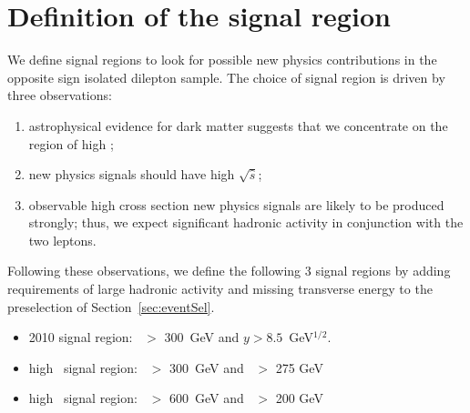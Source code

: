 \section{Definition of the signal region}
\label{sec:sigregion}

We define signal regions to look for possible
new physics contributions in the opposite sign isolated 
dilepton sample. The choice of signal region is driven by 
three observations:
\begin{enumerate}
\item astrophysical evidence for dark matter suggests that
we concentrate on the region of high \met;
\item new physics signals should have high $\sqrt{\hat{s}}$;
\item observable high cross section new physics signals 
are likely to be produced strongly;  thus, we expect significant
hadronic activity in conjunction with the two leptons.
\end{enumerate}

Following these observations, we define the following 3 signal regions by 
adding requirements of large hadronic activity and missing transverse energy 
to the preselection of Section~\ref{sec:eventSel}. 
\begin{itemize}
\item 2010 signal region:       \Ht\ $>$ 300~GeV and $y > 8.5$~GeV$^{1/2}$.
\item high \met\ signal region: \Ht\ $>$ 300~GeV and \met\ $>$ 275 GeV
\item high \Ht\  signal region: \Ht\ $>$ 600~GeV and \met\ $>$ 200 GeV
\end{itemize}


